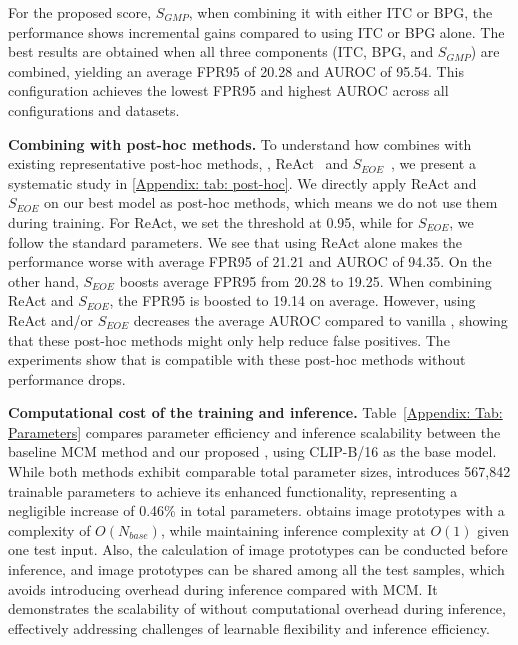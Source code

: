For the proposed score, $S_{\textit{GMP}}$, 
when combining it with either ITC or BPG, the performance shows incremental gains compared to using ITC or BPG alone. 
The best results are obtained when all three components (ITC, BPG, and $S_{\textit{GMP}}$) are combined, yielding an average FPR95 of 20.28 and AUROC of 95.54. This configuration achieves the lowest FPR95 and highest AUROC across all configurations and datasets.

\noindent
\textbf{Combining \ours with post-hoc methods.} 
To understand how \ours combines with existing representative post-hoc methods, \ie, ReAct~\cite{sun_react_2021} and $S_{\textit{EOE}}$~\cite{cao_envisioning_2024}, we present a systematic study in \cref{Appendix: tab: post-hoc}. 
We directly apply ReAct and $S_{\textit{EOE}}$ on our best model as post-hoc methods, which means we do not use them during training. 
For ReAct, we set the threshold at 0.95, while for $S_{\textit{EOE}}$, we follow the standard parameters. 
We see that using ReAct alone makes the performance worse with average FPR95 of 21.21 and AUROC of 94.35. 
On the other hand, $S_{\textit{EOE}}$ boosts average FPR95 from 20.28 to 19.25. 
When combining ReAct and $S_{\textit{EOE}}$, the FPR95 is boosted to 19.14 on average. 
However, using ReAct and/or $S_{\textit{EOE}}$ decreases the average AUROC compared to vanilla \ours, showing that these post-hoc methods might only help reduce false positives. 
The experiments show that \ours is compatible with these post-hoc methods without performance drops.

\noindent
\textbf{Computational cost of the training and inference.}
Table~\ref{Appendix: Tab: Parameters} compares parameter efficiency and inference scalability between the baseline MCM method and our proposed \ours, using CLIP-B/16 as the base model. 
While both methods exhibit comparable total parameter sizes, \ours introduces 567,842 trainable parameters to achieve its enhanced functionality, representing a negligible increase of 0.46\% in total parameters. 
\ours obtains image prototypes with a complexity of $O(N_{base})$, while maintaining inference complexity at $O(1)$ given one test input. 
Also, the calculation of image prototypes can be conducted before inference, and image prototypes can be shared among all the test samples, which avoids introducing overhead during inference compared with MCM. 
It demonstrates the scalability of \ours without computational overhead during inference, effectively addressing challenges of learnable flexibility and inference efficiency.







